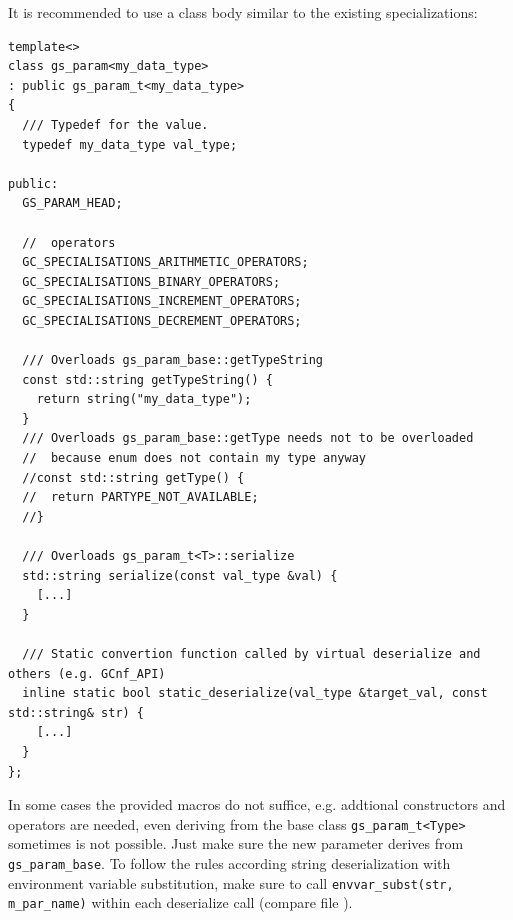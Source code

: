 It is recommended to use a class body similar to the existing specializations:
\begin{lstlisting}
template<>
class gs_param<my_data_type>
: public gs_param_t<my_data_type>
{
  /// Typedef for the value.
  typedef my_data_type val_type;

public:
  GS_PARAM_HEAD;

  //  operators
  GC_SPECIALISATIONS_ARITHMETIC_OPERATORS;
  GC_SPECIALISATIONS_BINARY_OPERATORS;
  GC_SPECIALISATIONS_INCREMENT_OPERATORS;
  GC_SPECIALISATIONS_DECREMENT_OPERATORS;

  /// Overloads gs_param_base::getTypeString
  const std::string getTypeString() {
    return string("my_data_type");
  }
  /// Overloads gs_param_base::getType needs not to be overloaded
  //  because enum does not contain my type anyway
  //const std::string getType() {
  //  return PARTYPE_NOT_AVAILABLE;
  //}

  /// Overloads gs_param_t<T>::serialize
  std::string serialize(const val_type &val) {
    [...]
  }

  /// Static convertion function called by virtual deserialize and others (e.g. GCnf_API)
  inline static bool static_deserialize(val_type &target_val, const std::string& str) {
    [...]
  }
};
\end{lstlisting}

In some cases the provided macros do not suffice, e.g. addtional constructors and operators are needed, even deriving from the base class \lstinline|gs_param_t<Type>| sometimes is not possible. Just make sure the new parameter derives from \lstinline|gs_param_base|. To follow the rules according string deserialization with environment variable substitution, make sure to call \lstinline|envvar_subst(str, m_par_name)| within each deserialize call (compare file ).

